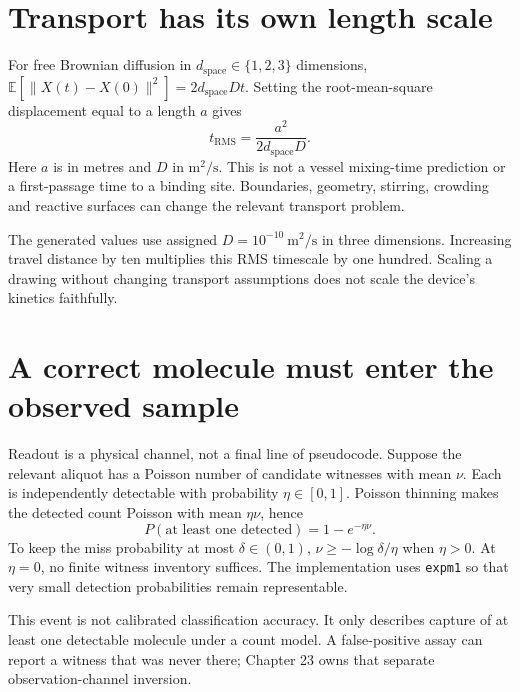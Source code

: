 \section{Transport has its own length scale}
For free Brownian diffusion in $d_{\mathrm{space}}\in\{1,2,3\}$ dimensions,
$\mathbb E[\|X(t)-X(0)\|^2]=2d_{\mathrm{space}}Dt$.
Setting the root-mean-square displacement equal to a length $a$ gives
\begin{equation}
t_{\mathrm{RMS}}=\frac{a^2}{2d_{\mathrm{space}}D}.
\label{dnad24:diffusion}
\end{equation}
Here $a$ is in metres and $D$ in $\mathrm{m}^2/\mathrm{s}$.
This is not a vessel mixing-time prediction or a first-passage time to a binding
site. Boundaries, geometry, stirring, crowding and reactive surfaces can change the
relevant transport problem.
\begin{center}\small\end{center}
The generated values use assigned $D=10^{-10}\ \mathrm{m}^2/\mathrm{s}$ in three
dimensions. Increasing travel distance by ten multiplies this RMS timescale by
one hundred. Scaling a drawing without changing transport assumptions does not
scale the device's kinetics faithfully.

\section{A correct molecule must enter the observed sample}
Readout is a physical channel, not a final line of pseudocode. Suppose the relevant
aliquot has a Poisson number of candidate witnesses with mean $\nu$.
Each is independently detectable with probability $\eta\in[0,1]$.
Poisson thinning makes the detected count Poisson with mean $\eta\nu$, hence
\begin{equation}
P(\text{at least one detected})=1-e^{-\eta\nu}.
\label{dnad24:detect}
\end{equation}
To keep the miss probability at most $\delta\in(0,1)$,
$\nu\ge-\log\delta/\eta$ when $\eta>0$.
At $\eta=0$, no finite witness inventory suffices. The implementation uses
\texttt{expm1} so that very small detection probabilities remain representable.
\begin{center}\small\end{center}

This event is not calibrated classification accuracy. It only describes capture
of at least one detectable molecule under a count model. A false-positive assay
can report a witness that was never there; Chapter 23 owns that separate
observation-channel inversion.

